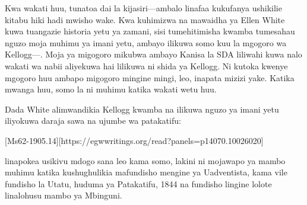 Kwa wakati huu, tunatoa dai la kijasiri—ambalo linafaa kukufanya ushikilie kitabu hiki hadi mwisho wake. Kwa kuhimizwa na mawaidha ya Ellen White kuwa tuangazie historia yetu ya zamani, sisi tumehitimisha kwamba tumesahau nguzo moja muhimu ya imani yetu, ambayo ilikuwa somo kuu la mgogoro wa Kellogg—. Moja ya migogoro mikubwa ambayo Kanisa la SDA liliwahi kuwa nalo wakati wa nabii aliyekuwa hai lilikuwa ni shida ya Kellogg. Ni kutoka kwenye mgogoro huu ambapo migogoro mingine mingi, leo, inapata mizizi yake. Katika mwanga huu, somo la  ni muhimu katika wakati wetu huu.


Dada White alimwandikia Kellogg kwamba  na  ilikuwa nguzo ya imani yetu iliyokuwa daraja sawa na ujumbe wa patakatifu:


[Ms62-1905.14][https://egwwritings.org/read?panels=p14070.10026020]


 linapokea usikivu mdogo sana leo kama somo, lakini ni mojawapo ya mambo muhimu katika kushughulikia mafundisho mengine ya Uadventista, kama vile fundisho la Utatu, huduma ya Patakatifu, 1844 na fundisho lingine lolote linalohusu mambo ya Mbinguni.


